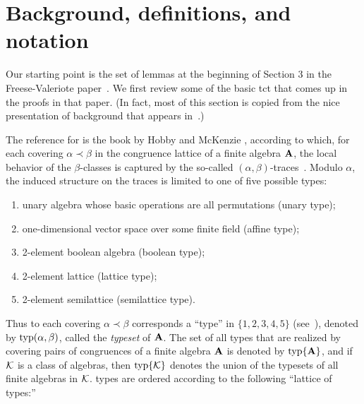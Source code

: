 

\section{Background, definitions, and notation}
\label{sec:defin-notat}
Our starting point is the set of lemmas at the beginning of Section 3 in
the Freese-Valeriote paper~\cite{Freese:2009}.
We first review some of the basic \ac{tct}
that comes up in the proofs in that paper. (In fact, most of this section 
is copied from the nice presentation of \tct background that appears
in~\cite[Sec.~2]{Freese:2009}.)

The reference for \tct is the book by Hobby and McKenzie
\cite{HM:1988}, according to which,
for each covering $\alpha \prec \beta$ in the congruence lattice of a finite
algebra $\mathbf{A}$, the local behavior of the $\beta$-classes is captured by the
so-called $(\alpha, \beta)$-traces~\cite[Def.~2.15]{HM:1988}.
Modulo $\alpha$, the induced structure on the traces is limited to one
of five possible types:

\begin{enumerate}[(1)]
\item unary algebra whose basic operations are all permutations (unary type);
\item one-dimensional vector space over some finite field (affine type);
\item 2-element boolean algebra (boolean type);
\item 2-element lattice (lattice type);
\item 2-element semilattice (semilattice type).
\end{enumerate}

Thus to each covering $\alpha \prec \beta$
corresponds a ``\tct type'' in $\{1,2,3,4,5\}$ 
(see~\cite[Def.~5.1]{HM:1988}),
denoted by $\operatorname{typ}(\alpha, \beta)$, called the \emph{typeset} of $\mathbf{A}$.
The set of all \tct types that are realized by covering pairs of congruences of a
finite algebra $\mathbf{A}$ is denoted by $\operatorname{typ}\{\mathbf{A}\}$, and if $\mathcal{K}$ is a class of algebras,
then $\operatorname{typ}\{\mathcal{K}\}$ denotes the union of the typesets of all finite algebras in $\mathcal{K}$.
\tct types are ordered according to the following ``lattice of types:''

